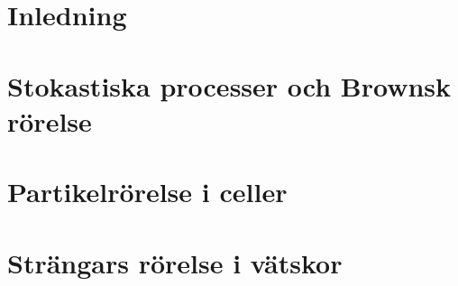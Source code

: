 \documentclass[11pt,a4paper, notitlepage, german, english, swedish]{report}
\begin{document}





\chapter{Inledning}





\chapter{Stokastiska processer och Brownsk rörelse}



\chapter{Partikelrörelse i celler}


\chapter{Strängars rörelse i vätskor}









\newpage


\clearpage
\appendix
\end{document}
